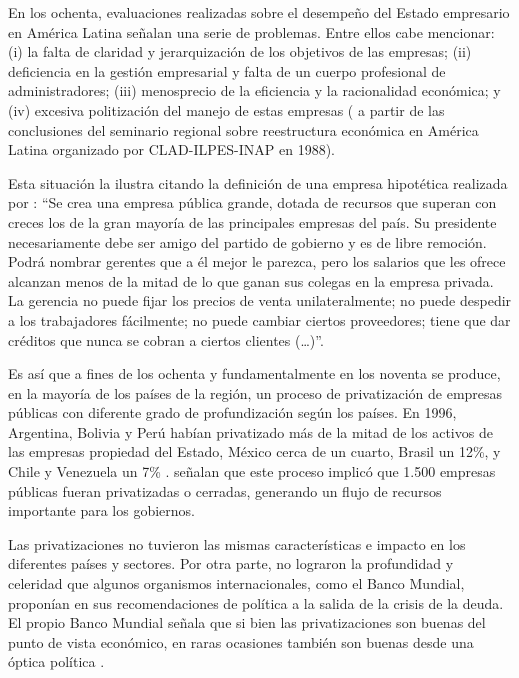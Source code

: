 \documentclass[
  12pt,
  spanish,
]{book}
\begin{document}
En los ochenta, evaluaciones realizadas sobre el desempeño del Estado empresario en América Latina señalan una serie de problemas. Entre ellos cabe mencionar: (i) la falta de claridad y jerarquización de los objetivos de las empresas; (ii) deficiencia en la gestión empresarial y falta de un cuerpo profesional de administradores; (iii) menosprecio de la eficiencia y la racionalidad económica; y (iv) excesiva politización del manejo de estas empresas (\citet{Morales1990} a partir de las conclusiones del seminario regional sobre reestructura económica en América Latina organizado por CLAD-ILPES-INAP en 1988).

Esta situación la ilustra citando la definición de una empresa hipotética realizada por \citet{Kelly1985}: ``Se crea una empresa pública grande, dotada de recursos que superan con creces los de la gran mayoría de las principales empresas del país. Su presidente necesariamente debe ser amigo del partido de gobierno y es de libre remoción. Podrá nombrar gerentes que a él mejor le parezca, pero los salarios que les ofrece alcanzan menos de la mitad de lo que ganan sus colegas en la empresa privada. La gerencia no puede fijar los precios de venta unilateralmente; no puede despedir a los trabajadores fácilmente; no puede cambiar ciertos proveedores; tiene que dar créditos que nunca se cobran a ciertos clientes (\ldots)''.

Es así que a fines de los ochenta y fundamentalmente en los noventa se produce, en la mayoría de los países de la región, un proceso de privatización de empresas públicas con diferente grado de profundización según los países. En 1996, Argentina, Bolivia y Perú habían privatizado más de la mitad de los activos de las empresas propiedad del Estado, México cerca de un cuarto, Brasil un 12\%, y Chile y Venezuela un 7\% \citep{Ramamurti1999}. \citet{Estache2004} señalan que este proceso implicó que 1.500 empresas públicas fueran privatizadas o cerradas, generando un flujo de recursos importante para los gobiernos.

Las privatizaciones no tuvieron las mismas características e impacto en los diferentes países y sectores. Por otra parte, no lograron la profundidad y celeridad que algunos organismos internacionales, como el Banco Mundial, proponían en sus recomendaciones de política a la salida de la crisis de la deuda. El propio Banco Mundial señala que si bien las privatizaciones son buenas del punto de vista económico, en raras ocasiones también son buenas desde una óptica política \citep{WorldBank1995}.
\end{document}
